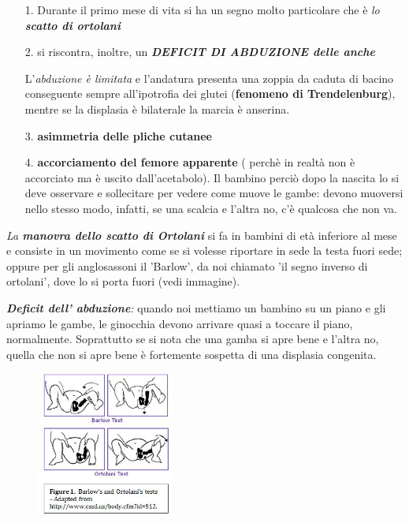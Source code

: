 \begin{itemize}
\item[1.] Durante  il primo mese di vita si ha un segno molto particolare che è \emph{lo \textbf{scatto di ortolani}}
\item[2.] si riscontra, inoltre, un \textbf{\emph{DEFICIT DI ABDUZIONE delle anche}}

L'\emph{abduzione è limitata} e l'andatura presenta una zoppia da caduta di bacino conseguente sempre all'ipotrofia dei glutei (\textbf{fenomeno di Trendelenburg}), mentre se la displasia è bilaterale la marcia è anserina.

\item[3.] \textbf{asimmetria delle pliche cutanee}

\item[4.] \textbf{accorciamento del femore apparente} ( perchè in realtà non è accorciato ma è uscito dall'acetabolo). Il bambino perciò dopo la nascita lo si deve osservare e sollecitare per vedere come muove le
gambe: devono muoversi nello stesso modo, infatti, se una scalcia e l'altra no, c'è qualcosa che non va.
\end{itemize}

\emph{La \textbf{manovra dello scatto di Ortolani}} si fa in bambini di età inferiore al mese e consiste in un movimento come se si volesse riportare in sede la testa fuori sede; oppure per gli anglosassoni il 'Barlow', da noi chiamato 'il segno inverso di ortolani', dove lo si
porta fuori (vedi immagine).

\emph{\textbf{Deficit dell' abduzione}:} quando noi mettiamo un bambino su un piano e gli apriamo le gambe, le ginocchia devono arrivare quasi a toccare il piano, normalmente. Soprattutto se si nota che una gamba si apre bene e l'altra no, quella che non si apre bene è fortemente sospetta di una displasia congenita.

\begin{figure}[!ht]
\centering
\includegraphics[width=0.4\textwidth]{018/image7.jpeg}
\end{figure}


